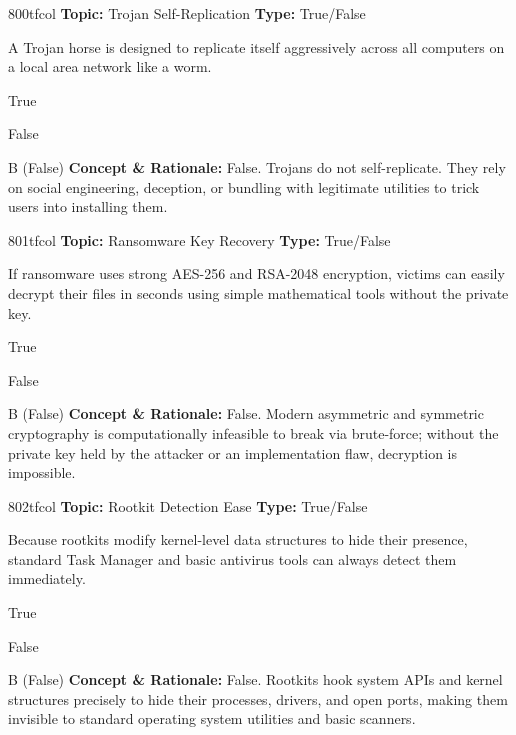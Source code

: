 \begin{qcard}{800}{tfcol}
\textcolor{darkslate!75}{\small\textbf{Topic:} Trojan Self-Replication \hfill \textbf{Type:} True/False}\vspace{0.4em}\par
A Trojan horse is designed to replicate itself aggressively across all computers on a local area network like a worm.
\begin{qoptions}
\item True
\item False
\end{qoptions}
\end{qcard}
\nopagebreak
\begin{explainbox}{B (False)}
\textbf{Concept \& Rationale:} False. Trojans do not self-replicate. They rely on social engineering, deception, or bundling with legitimate utilities to trick users into installing them.
\end{explainbox}

\begin{qcard}{801}{tfcol}
\textcolor{darkslate!75}{\small\textbf{Topic:} Ransomware Key Recovery \hfill \textbf{Type:} True/False}\vspace{0.4em}\par
If ransomware uses strong AES-256 and RSA-2048 encryption, victims can easily decrypt their files in seconds using simple mathematical tools without the private key.
\begin{qoptions}
\item True
\item False
\end{qoptions}
\end{qcard}
\nopagebreak
\begin{explainbox}{B (False)}
\textbf{Concept \& Rationale:} False. Modern asymmetric and symmetric cryptography is computationally infeasible to break via brute-force; without the private key held by the attacker or an implementation flaw, decryption is impossible.
\end{explainbox}

\begin{qcard}{802}{tfcol}
\textcolor{darkslate!75}{\small\textbf{Topic:} Rootkit Detection Ease \hfill \textbf{Type:} True/False}\vspace{0.4em}\par
Because rootkits modify kernel-level data structures to hide their presence, standard Task Manager and basic antivirus tools can always detect them immediately.
\begin{qoptions}
\item True
\item False
\end{qoptions}
\end{qcard}
\nopagebreak
\begin{explainbox}{B (False)}
\textbf{Concept \& Rationale:} False. Rootkits hook system APIs and kernel structures precisely to hide their processes, drivers, and open ports, making them invisible to standard operating system utilities and basic scanners.
\end{explainbox}

